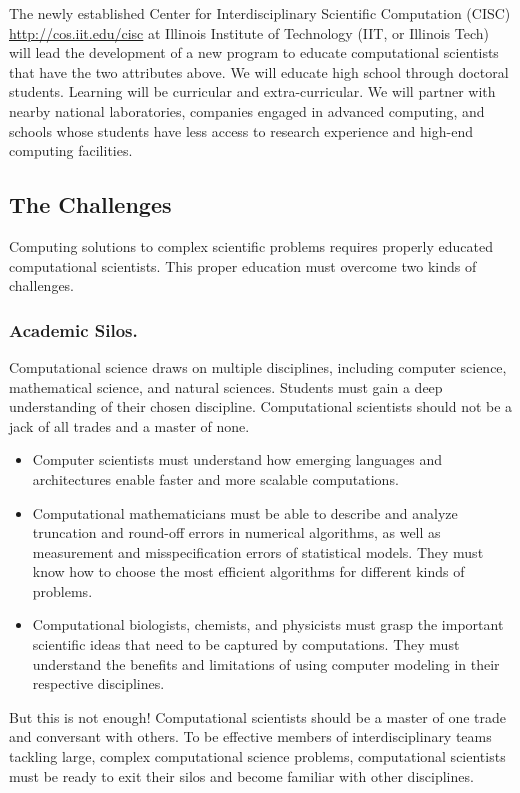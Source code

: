 \documentclass[11pt]{NSFamsart}
\begin{document}
The newly established Center for Interdisciplinary Scientific Computation (CISC) \url{http://cos.iit.edu/cisc} at Illinois Institute of Technology (IIT, or Illinois Tech) will lead the development of a new program  to educate computational scientists that have the two attributes above.  We will educate high school through doctoral students.  Learning will be curricular and extra-curricular.  We will partner with nearby national laboratories, companies engaged in advanced computing, and schools whose students have less access to research experience and high-end computing facilities.

\subsection*{The Challenges}
Computing solutions to complex scientific problems requires properly educated computational scientists.  This proper education must overcome two kinds of challenges.

\subsubsection*{Academic Silos.} Computational science draws on multiple disciplines, including computer science, mathematical science, and natural sciences.  Students must gain a deep understanding of their chosen discipline. Computational scientists should not be a jack of all trades and a master of none.

\begin{itemize}
\item Computer scientists must understand how emerging languages and architectures enable faster and more scalable computations.  

\item Computational mathematicians must be able to describe and analyze truncation and round-off errors in numerical algorithms, as well as measurement and misspecification errors of statistical models.  They must know how to choose the most efficient algorithms for different kinds of problems.

\item Computational biologists, chemists, and physicists must grasp the important scientific ideas that need to be captured by computations.  They must understand the benefits and limitations of using computer modeling in their respective disciplines.

\end{itemize}
But this is not enough!  Computational scientists should be a master of one trade and conversant with others.  To be effective members of interdisciplinary teams tackling large, complex computational science problems, computational scientists must be ready to exit their silos and become familiar with other disciplines.
\end{document}
